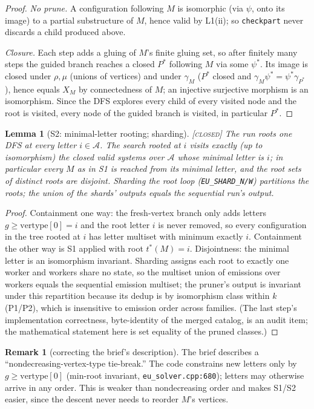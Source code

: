 \documentclass[11pt]{article}
\newtheorem{lemma}[theorem]{Lemma}
\theoremstyle{definition}
\newtheorem{remark}[theorem]{Remark}
\newcommand{\CLOSED}{\textnormal{\textsc{[closed]}}}
\newcommand{\A}{\mathcal{A}}
\begin{document}
\begin{proof}
\emph{No prune.} A configuration following $M$ is isomorphic (via $\psi$, onto its image)
to a partial substructure of $M$, hence valid by L1(ii); so \texttt{checkpart} never
discards a child produced above.

\emph{Closure.} Each step adds a gluing of $M$'s finite gluing set, so after finitely
many steps the guided branch reaches a closed $P^\ast$ following $M$ via some
$\psi^\ast$. Its image is closed under $\rho, \mu$ (unions of vertices) and under
$\gamma_M$ ($P^\ast$ closed and $\gamma_M\psi^\ast = \psi^\ast\gamma_{P^\ast}$), hence
equals $X_M$ by connectedness of $M$; an injective surjective morphism is an
isomorphism. Since the DFS explores every child of every visited node and the root is
visited, every node of the guided branch is visited, in particular $P^\ast$.
\end{proof}

\begin{lemma}[S2: minimal-letter rooting; sharding]\label{lem:S2} \CLOSED\;
The run roots one DFS at every letter $i \in \A$. The search rooted at $i$ visits exactly
(up to isomorphism) the closed valid systems over $\A$ whose minimal letter is $i$; in
particular every $M$ as in S1 is reached from its minimal letter, and the root sets of
distinct roots are disjoint. Sharding the root loop (\texttt{EU\_SHARD\_N/W}) partitions
the roots; the union of the shards' outputs equals the sequential run's output.
\end{lemma}

\begin{proof}
Containment one way: the fresh-vertex branch only adds letters
$g \ge \mathrm{vertype}[0] = i$ and the root letter $i$ is never removed, so every
configuration in the tree rooted at $i$ has letter multiset with minimum exactly $i$.
Containment the other way is S1 applied with root $t^\ast(M) = i$. Disjointness: the
minimal letter is an isomorphism invariant. Sharding assigns each root to exactly one
worker and workers share no state, so the multiset union of emissions over workers equals
the sequential emission multiset; the pruner's output is invariant under this
repartition because its dedup is by isomorphism class within $k$ (P1/P2), which is
insensitive to emission order across families. (The last step's implementation
correctness, byte-identity of the merged catalog, is an audit item; the mathematical
statement here is set equality of the pruned classes.)
\end{proof}

\begin{remark}[correcting the brief's description]
The brief describes a ``nondecreasing-vertex-type tie-break.'' The code constrains new
letters only by $g \ge \mathrm{vertype}[0]$ (min-root invariant,
\texttt{eu\_solver.cpp:680}); letters may otherwise arrive in any order. This is weaker
than nondecreasing order and makes S1/S2 easier, since the descent never needs to reorder
$M$'s vertices.
\end{remark}
\end{document}
